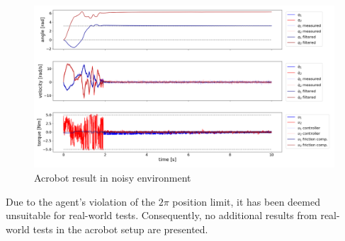 \begin{figure}[H]
    \centering
    \includegraphics[width=1.0\linewidth]{figures/hardware_result/acrobot_noisy_simulation_designC.1.png}
    \caption{Acrobot result in noisy environment}
    \label{fig:acrobot_noisy}
\end{figure}

Due to the agent's violation of the \(2\pi\) position limit, it has been deemed unsuitable for real-world tests. Consequently, no additional results from real-world tests in the acrobot setup are presented.

\cleardoublepage
